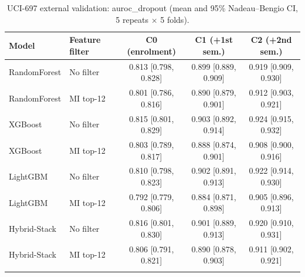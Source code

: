 \begin{table}[t]
\centering
\small
\caption{UCI-697 external validation: auroc\_dropout (mean and 95\% Nadeau--Bengio CI, 5 repeats $\times$ 5 folds).}
\label{tab:uci697_auroc_dropout}
\begin{tabular}{llccc}
\toprule
Model & Feature filter & C0 (enrolment) & C1 (+1st sem.) & C2 (+2nd sem.) \\
\midrule
RandomForest & No filter & 0.813 [0.798, 0.828] & 0.899 [0.889, 0.909] & 0.919 [0.909, 0.930] \\
RandomForest & MI top-12 & 0.801 [0.786, 0.816] & 0.890 [0.879, 0.901] & 0.912 [0.903, 0.921] \\
\addlinespace
XGBoost & No filter & 0.815 [0.801, 0.829] & 0.903 [0.892, 0.914] & 0.924 [0.915, 0.932] \\
XGBoost & MI top-12 & 0.803 [0.789, 0.817] & 0.888 [0.874, 0.901] & 0.908 [0.900, 0.916] \\
\addlinespace
LightGBM & No filter & 0.810 [0.798, 0.823] & 0.902 [0.891, 0.913] & 0.922 [0.914, 0.930] \\
LightGBM & MI top-12 & 0.792 [0.779, 0.806] & 0.884 [0.871, 0.898] & 0.905 [0.896, 0.913] \\
\addlinespace
Hybrid-Stack & No filter & 0.816 [0.801, 0.830] & 0.901 [0.889, 0.913] & 0.920 [0.910, 0.931] \\
Hybrid-Stack & MI top-12 & 0.806 [0.791, 0.821] & 0.890 [0.878, 0.903] & 0.911 [0.902, 0.921] \\
\addlinespace
\bottomrule
\end{tabular}
\end{table}